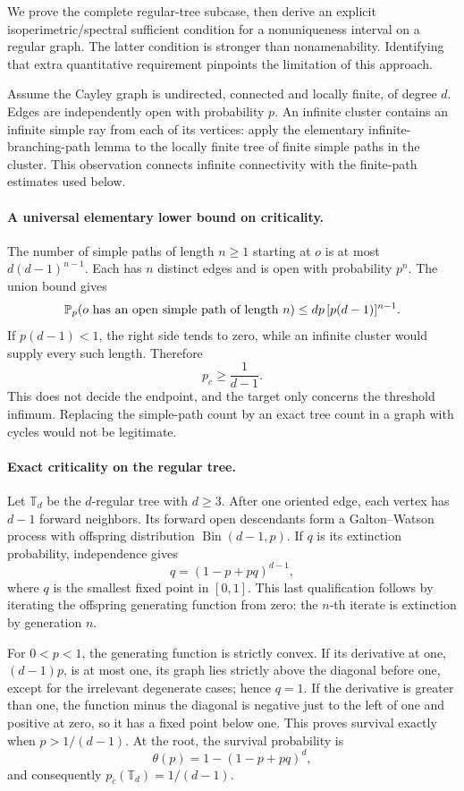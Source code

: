 \documentclass[11pt]{article}
\begin{document}
We prove the complete regular-tree subcase, then derive an explicit
isoperimetric/spectral sufficient condition for a nonuniqueness
interval on a regular graph. The latter condition is stronger than
nonamenability. Identifying that extra quantitative requirement
pinpoints the limitation of this approach.

Assume the Cayley graph is undirected, connected and locally finite,
of degree $d$. Edges are independently open with probability $p$.
An infinite cluster contains an infinite simple ray from each of
its vertices: apply the elementary infinite-branching-path lemma
to the locally finite tree of finite simple paths in the cluster.
This observation connects infinite connectivity with the finite-path
estimates used below.

\paragraph{A universal elementary lower bound on criticality.}
The number of simple paths of length $n\geq1$ starting at $o$ is
at most $d(d-1)^{n-1}$. Each has $n$ distinct edges and is open
with probability $p^n$. The union bound gives
\[
 \mathbb P_p(o\hbox{ has an open simple path of length }n)
      \leq d p\,[p(d-1)]^{n-1}.
\]
If $p(d-1)<1$, the right side tends to zero, while an infinite
cluster would supply every such length. Therefore
\[
 p_c\geq\frac1{d-1}.
 \tag{360.1}
\]
This does not decide the endpoint, and the target only concerns
the threshold infimum. Replacing the simple-path count by an exact
tree count in a graph with cycles would not be legitimate.

\paragraph{Exact criticality on the regular tree.}
Let $\mathbb T_d$ be the $d$-regular tree with $d\geq3$. After
one oriented edge, each vertex has $d-1$ forward neighbors. Its
forward open descendants form a Galton--Watson process with
offspring distribution $\operatorname{Bin}(d-1,p)$. If $q$ is its
extinction probability, independence gives
\[
 q=(1-p+pq)^{d-1},
 \tag{360.2}
\]
where $q$ is the smallest fixed point in $[0,1]$. This last
qualification follows by iterating the offspring generating function
from zero: the $n$-th iterate is extinction by generation $n$.

For $0<p<1$, the generating function is strictly convex. If its
derivative at one, $(d-1)p$, is at most one, its graph lies strictly
above the diagonal before one, except for the irrelevant degenerate
cases; hence $q=1$. If the derivative is greater than one, the
function minus the diagonal is negative just to the left of one
and positive at zero, so it has a fixed point below one. This proves
survival exactly when $p>1/(d-1)$. At the root, the survival probability is
\[
 \theta(p)=1-(1-p+pq)^d,
 \tag{360.3}
\]
and consequently $p_c(\mathbb T_d)=1/(d-1)$.
\end{document}
